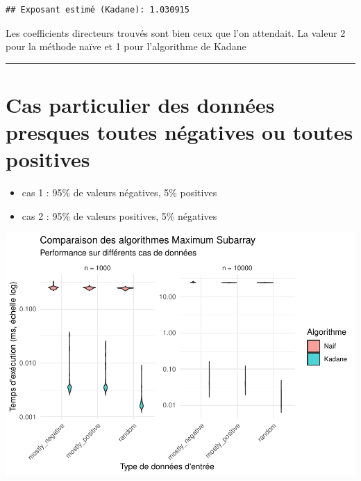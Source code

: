 \documentclass[
]{article}
\providecommand{\tightlist}{%
  \setlength{\itemsep}{0pt}\setlength{\parskip}{0pt}}
\begin{document}
\begin{verbatim}
## Exposant estimé (Kadane): 1.030915
\end{verbatim}

Les coefficients directeurs trouvés sont bien ceux que l'on attendait.
La valeur 2 pour la méthode naïve et 1 pour l'algorithme de Kadane

\begin{center}\rule{0.5\linewidth}{0.5pt}\end{center}

\section{Cas particulier des données presques toutes négatives ou toutes
positives}\label{cas-particulier-des-donnuxe9es-presques-toutes-nuxe9gatives-ou-toutes-positives}

\begin{itemize}
\tightlist
\item
  cas 1 : 95\% de valeurs négatives, 5\% positives
\item
  cas 2 : 95\% de valeurs positives, 5\% négatives
\end{itemize}

\includegraphics{MaxSubarray1D_files/figure-latex/benchmark2-1.pdf}
\end{document}

